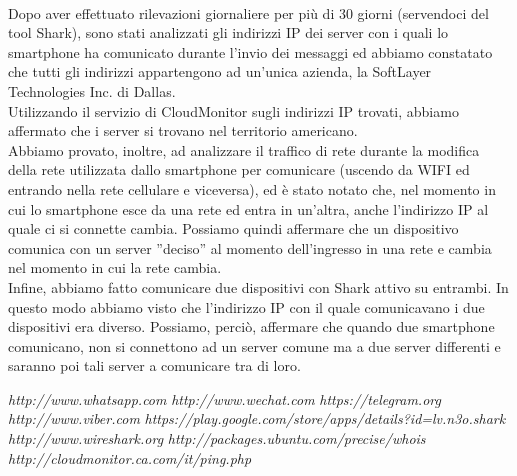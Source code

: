 \documentclass[a4paper,11pt]{book}
\begin{document}
~

Dopo aver effettuato rilevazioni giornaliere per pi\`u di 30 giorni (servendoci del tool Shark), sono stati analizzati gli indirizzi IP dei server con i quali lo smartphone ha comunicato durante l'invio dei messaggi ed abbiamo constatato che tutti gli indirizzi appartengono ad un'unica azienda, la SoftLayer Technologies Inc. di Dallas.\\
Utilizzando il servizio di CloudMonitor sugli indirizzi IP trovati, abbiamo affermato che i server si trovano nel territorio americano.\\
Abbiamo provato, inoltre, ad analizzare il traffico di rete durante la modifica della rete utilizzata dallo smartphone per comunicare (uscendo da WIFI ed entrando nella rete cellulare e viceversa), ed \`e stato notato che, nel momento in cui lo smartphone esce da una rete ed entra in un'altra, anche l'indirizzo IP al quale ci si connette cambia. Possiamo quindi affermare che un dispositivo comunica con un server ''deciso'' al momento dell'ingresso in una rete e cambia nel momento in cui la rete cambia.\\
Infine, abbiamo fatto comunicare due dispositivi con Shark attivo su entrambi. In questo modo abbiamo visto che l'indirizzo IP con il quale comunicavano i due dispositivi era diverso. Possiamo, perci\`o, affermare che quando due smartphone comunicano, non si connettono ad un server comune ma a due server differenti e saranno poi tali server a comunicare tra di loro. 

\begin{thebibliography}{}
 \emph{http://www.whatsapp.com}
 \emph{http://www.wechat.com}
 \emph{https://telegram.org}
 \emph{http://www.viber.com}
 \emph{https://play.google.com/store/apps/details?id=lv.n3o.shark}
 \emph{http://www.wireshark.org}
 \emph{http://packages.ubuntu.com/precise/whois}
 \emph{http://cloudmonitor.ca.com/it/ping.php}
\end{thebibliography}
\end{document}

